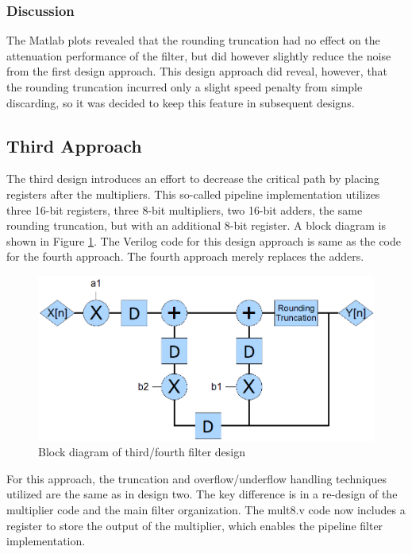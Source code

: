 \subsubsection*{Discussion}
The Matlab plots revealed that the rounding truncation had no effect on the attenuation performance of the filter, but did however slightly reduce the noise from the first design approach. This design approach did reveal, however, that the rounding truncation incurred only a slight speed penalty from simple discarding, so it was decided to keep this feature in subsequent designs.



\subsection*{Third Approach}
The third design introduces an effort to decrease the critical path by placing registers after the multipliers. This so-called pipeline implementation utilizes three 16-bit registers, three 8-bit multipliers, two 16-bit adders, the same rounding truncation, but with an additional 8-bit register.  A block diagram is shown in Figure \ref{fig:block3}. The Verilog code for this design approach is same as the code for the fourth approach. The fourth approach merely replaces the adders.

\begin{figure}[h]
\begin{center}
\includegraphics[scale=0.5]{block_three.png}
\end{center}
\caption{Block diagram of third/fourth filter design}
\label{fig:block3}
\end{figure}

For this approach, the truncation and overflow/underflow handling techniques utilized are the same as in design two. The key difference is in a re-design of the multiplier code and the main filter organization. The mult8.v code now includes a register to store the output of the multiplier, which enables the pipeline filter implementation.


